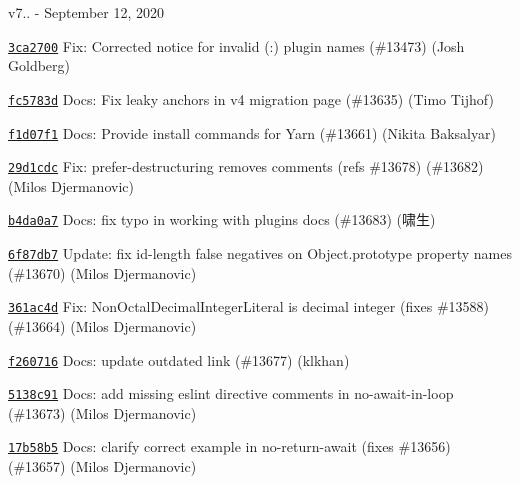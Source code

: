 v7.. -\/ September 12, 2020


\begin{DoxyItemize}
\item \href{https://github.com/eslint/eslint/commit/3ca27004ece5016ba7aed775f01ad13bc9282296}{\texttt{ {\ttfamily 3ca2700}}} Fix\+: Corrected notice for invalid (\+:) plugin names (\#13473) (Josh Goldberg)
\item \href{https://github.com/eslint/eslint/commit/fc5783d2ff9e3b0d7a1f9664928d49270b4a6c01}{\texttt{ {\ttfamily fc5783d}}} Docs\+: Fix leaky anchors in v4 migration page (\#13635) (Timo Tijhof)
\item \href{https://github.com/eslint/eslint/commit/f1d07f112be96c64dfdaa154aa9ac81985b16238}{\texttt{ {\ttfamily f1d07f1}}} Docs\+: Provide install commands for Yarn (\#13661) (Nikita Baksalyar)
\item \href{https://github.com/eslint/eslint/commit/29d1cdceedd6c056a39149723cf9ff2fbb260cbf}{\texttt{ {\ttfamily 29d1cdc}}} Fix\+: prefer-\/destructuring removes comments (refs \#13678) (\#13682) (Milos Djermanovic)
\item \href{https://github.com/eslint/eslint/commit/b4da0a7ca7995435bdfc116fd374eb0649470131}{\texttt{ {\ttfamily b4da0a7}}} Docs\+: fix typo in working with plugins docs (\#13683) (啸生)
\item \href{https://github.com/eslint/eslint/commit/6f87db7c318225e48ccbbf0bec8b3758ea839b82}{\texttt{ {\ttfamily 6f87db7}}} Update\+: fix id-\/length false negatives on Object.\+prototype property names (\#13670) (Milos Djermanovic)
\item \href{https://github.com/eslint/eslint/commit/361ac4d895c15086fb4351d4dca1405b2fdc4bd5}{\texttt{ {\ttfamily 361ac4d}}} Fix\+: Non\+Octal\+Decimal\+Integer\+Literal is decimal integer (fixes \#13588) (\#13664) (Milos Djermanovic)
\item \href{https://github.com/eslint/eslint/commit/f260716695064e4b4193337107b60401bd4b3f20}{\texttt{ {\ttfamily f260716}}} Docs\+: update outdated link (\#13677) (klkhan)
\item \href{https://github.com/eslint/eslint/commit/5138c913c256e4266ffb68278783af45bf70af84}{\texttt{ {\ttfamily 5138c91}}} Docs\+: add missing eslint directive comments in no-\/await-\/in-\/loop (\#13673) (Milos Djermanovic)
\item \href{https://github.com/eslint/eslint/commit/17b58b528df62bf96813d50c087cafdf83306810}{\texttt{ {\ttfamily 17b58b5}}} Docs\+: clarify correct example in no-\/return-\/await (fixes \#13656) (\#13657) (Milos Djermanovic)

\end{DoxyItemize}
